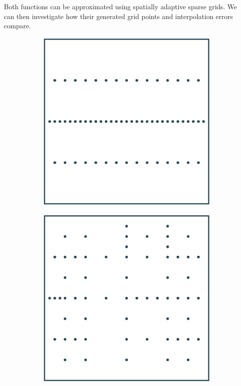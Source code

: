 \documentclass[
  a4paper,  %
  twoside,  %
  bibliography=totoc,
  headsepline,
  cleardoublepage=empty,
  parskip=half,
  draft=false
]{scrbook}
\begin{document}
Both functions can be approximated using spatially adaptive sparse grids.
We can then investigate how their generated grid points and interpolation errors compare.

\begin{mdframed}[style=style]
\vspace{2.5mm}
\begin{figure}[H]
\begin{subfigure}{.5\textwidth}
  \centering
  \includegraphics[width=.8\linewidth]{graphics/grid_f1}
  \label{fig:grid_f1}
\end{subfigure}%
\begin{subfigure}{.5\textwidth}
  \centering
  \includegraphics[width=.8\linewidth]{graphics/grid_f2}

\end{subfigure}
\end{figure}
\end{mdframed}
\end{document}
